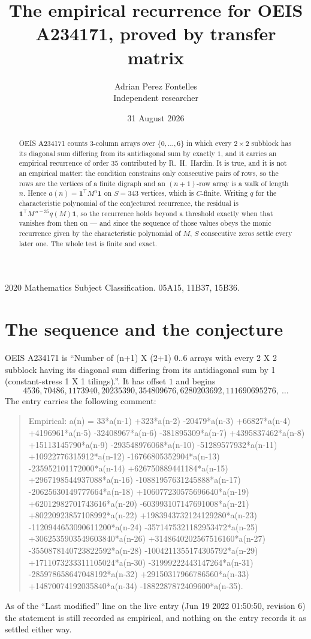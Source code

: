\documentclass[11pt,a4paper]{article}
\title{The empirical recurrence for OEIS A234171, proved by transfer matrix}
\author{Adrian Perez Fontelles\\ \small Independent researcher}
\date{31 August 2026}
\theoremstyle{plain}
\theoremstyle{definition}
\begin{document}
\maketitle

\begin{abstract}
OEIS A234171 counts $3$-column arrays over $\{0,\dots,6\}$ in which every
$2\times2$ subblock has its diagonal sum differing from its antidiagonal sum by
exactly $1$, and it
carries an empirical recurrence of order $35$ contributed by R.~H.~Hardin. It is true,
and it is not an empirical matter: the condition constrains only consecutive pairs of rows,
so the rows are the vertices of a finite digraph and an $(n+1)$-row array is a walk of
length $n$. Hence $a(n)=\mathbf{1}^{\!\top}M^{n}\mathbf{1}$ on $S=343$ vertices, which
is $C$-finite. Writing $q$ for the characteristic polynomial of the conjectured recurrence,
the residual is $\mathbf{1}^{\!\top}M^{\,n-35}q(M)\mathbf{1}$, so the recurrence
holds beyond a threshold exactly when that vanishes from then on --- and since the sequence
of those values obeys the monic recurrence given by the characteristic polynomial of $M$,
$S$ consecutive zeros settle every later one. The whole test is finite and exact.
\end{abstract}

\noindent\small 2020 Mathematics Subject Classification. 05A15, 11B37, 15B36.\normalsize

\section{The sequence and the conjecture}

OEIS A234171 is ``Number of (n+1) X (2+1) 0..6 arrays with every 2 X 2 subblock having its diagonal sum differing from its antidiagonal sum by 1 (constant-stress 1 X 1 tilings).''. It has offset
$1$ and begins
\[
4536, 70486, 1173940, 20235390, 354809676, 6280203692, 111690695276,\ \dots
\]
The entry carries the following comment:
\begin{quote}\small
Empirical: a(n) = 33*a(n-1) +323*a(n-2) -20479*a(n-3) +66827*a(n-4) +4196961*a(n-5) -32408967*a(n-6) -381895309*a(n-7) +4395837462*a(n-8) +15113145790*a(n-9) -293548976068*a(n-10) -51289577932*a(n-11) +10922776315912*a(n-12) -16766805352904*a(n-13) -235952101172000*a(n-14) +626750889441184*a(n-15) +2967198544937088*a(n-16) -10881957631245888*a(n-17) -20625630149777664*a(n-18) +106077230575696640*a(n-19) +62012982701743616*a(n-20) -603993107147691008*a(n-21) +80220923857108992*a(n-22) +1983943732124129280*a(n-23) -1120944653090611200*a(n-24) -3571475321182953472*a(n-25) +3062535903549603840*a(n-26) +3148640202567516160*a(n-27) -3550878140723822592*a(n-28) -1004211355174305792*a(n-29) +1711073233311105024*a(n-30) -31999222443147264*a(n-31) -285978658647048192*a(n-32) +29150317966786560*a(n-33) +14870074192035840*a(n-34) -1882287872409600*a(n-35).
\end{quote}
As of the ``Last modified'' line on the live entry (Jun 19 2022 01:50:50, revision 6) the statement is
still recorded as empirical, and nothing on the entry records it as settled either way.
\end{document}
